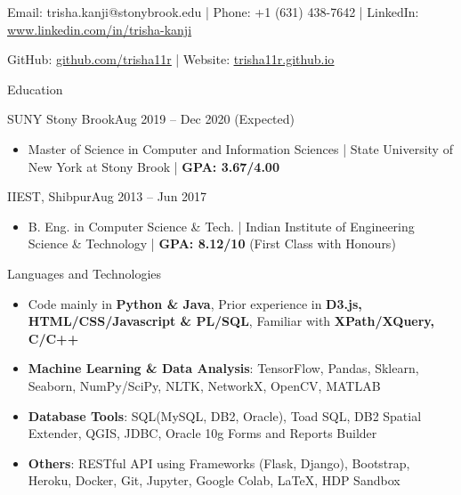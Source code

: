 \documentclass[]{mcdowellcv}
\begin{document}
	\makeheader
    
    \centering Email: trisha.kanji@stonybrook.edu | Phone: +1 (631) 438-7642 | LinkedIn: \underline{\href{https://www.linkedin.com/in/trisha-kanji/}{www.linkedin.com/in/trisha-kanji}}
    
    GitHub: \underline{\href{https://github.com/trisha11r}{github.com/trisha11r}}
    | Website: \underline{\href{https://trisha11r.github.io/}{trisha11r.github.io}}

	\begin{cvsection}{Education}
		\begin{cvsubsection}{SUNY Stony Brook}{}{Aug 2019 -- Dec 2020 (Expected)}
		
		
			\begin{itemize}
				\item Master of Science in Computer and Information Sciences | State University of New York at Stony Brook | \textbf{GPA: 3.67/4.00}
				

			\end{itemize}
		\end{cvsubsection}
		
		\begin{cvsubsection}{IIEST, Shibpur}{}{Aug 2013 -- Jun 2017}
			\begin{itemize}
				\item B. Eng. in Computer Science \& Tech. | Indian Institute of Engineering Science \& Technology | \textbf{GPA: 8.12/10} (First Class with Honours)
				

			\end{itemize}
		\end{cvsubsection}
	\end{cvsection}
	
	\begin{cvsection}{Languages and Technologies}
		\begin{cvsubsection}{}{}{}	
			\begin{itemize}
				\item Code mainly in \textbf{Python \& Java}, Prior experience in \textbf{D3.js, HTML/CSS/Javascript \& PL/SQL}, Familiar with \textbf{XPath/XQuery, C/C++}
				\item \textbf{Machine Learning \& Data Analysis}: TensorFlow, Pandas, Sklearn, Seaborn, NumPy/SciPy, NLTK, NetworkX, OpenCV, MATLAB
				\item \textbf{Database Tools}: SQL(MySQL, DB2, Oracle), Toad SQL, DB2 Spatial Extender, QGIS, JDBC, Oracle 10g Forms and Reports Builder 
				\item  \textbf {Others}: RESTful API using Frameworks (Flask, Django), Bootstrap, Heroku, Docker, Git, Jupyter, Google Colab,  LaTeX, HDP Sandbox
				
			\end{itemize}
		\end{cvsubsection}
	\end{cvsection}
	
\end{document}
